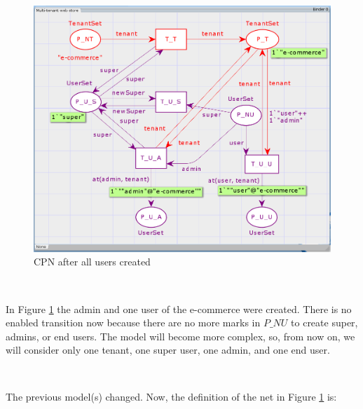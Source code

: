 \documentclass[12pt,english]{article} %
\begin{document}
\

\begin{figure}[H]
    \centering
    \includegraphics[scale=0.55]{img/mws/cpn/mws_cpn_all_users_created.png}
    \caption{CPN after all users created}
    \label{fig:mws-cpn-all-users-created}
\end{figure}

\

In Figure \ref{fig:mws-cpn-all-users-created} the admin and one user of the e-commerce were created.
There is no enabled transition now because there are no more marks in $P\_NU$ to create super, admins, or end users.
The model will become more complex, so, from now on, we will consider only one tenant, one super user, one admin, and one end user.

\

The previous model(s) changed.
Now, the definition of the net in Figure \ref{fig:mws-cpn-all-users-created} is:
\end{document}
